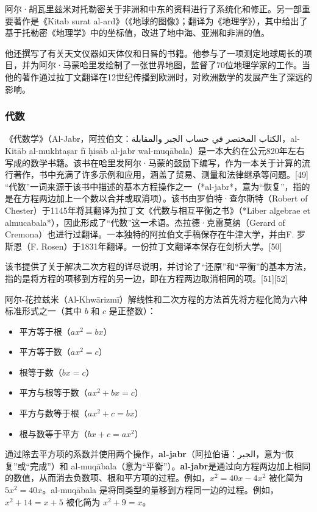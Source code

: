 阿尔·胡瓦里兹米对托勒密关于非洲和中东的资料进行了系统化和修正。另一部重要著作是《Kitab surat al-ard》（《地球的图像》；翻译为《地理学》），其中给出了基于托勒密《地理学》中的坐标值，改进了地中海、亚洲和非洲的值。

他还撰写了有关天文仪器如天体仪和日晷的书籍。他参与了一项测定地球周长的项目，并为阿尔·马蒙哈里发绘制了一张世界地图，监督了70位地理学家的工作。当他的著作通过拉丁文翻译在12世纪传播到欧洲时，对欧洲数学的发展产生了深远的影响。
\subsubsection{代数}
《代数学》（Al-Jabr，阿拉伯文：الكتاب المختصر في حساب الجبر والمقابلة，al-Kitāb al-mukhtaṣar fī ḥisāb al-jabr wal-muqābala）是一本大约在公元820年左右写成的数学书籍。该书在哈里发阿尔·马蒙的鼓励下编写，作为一本关于计算的流行著作，书中充满了许多示例和应用，涵盖了贸易、测量和法律继承等问题。[49] “代数”一词来源于该书中描述的基本方程操作之一（*al-jabr*，意为“恢复”，指的是在方程两边加上一个数以合并或取消项）。该书由罗伯特·查尔斯特（Robert of Chester）于1145年将其翻译为拉丁文《代数与相互平衡之书》（*Liber algebrae et almucabala*），因此形成了“代数”这一术语。杰拉德·克雷莫纳（Gerard of Cremona）也进行过翻译。一本独特的阿拉伯文手稿保存在牛津大学，并由F. 罗斯恩（F. Rosen）于1831年翻译。一份拉丁文翻译本保存在剑桥大学。[50]

该书提供了关于解决二次方程的详尽说明，并讨论了“还原”和“平衡”的基本方法，指的是将方程的项移到方程的另一边，即在方程两边取消相同的项。[51][52]

阿尔-花拉兹米（Al-Khwārizmī）解线性和二次方程的方法首先将方程化简为六种标准形式之一（其中 \(b\) 和 \(c\) 是正整数）：
\begin{itemize}
\item 平方等于根（\(ax^2 = bx\)）
\item 平方等于数（\(ax^2 = c\)）
\item 根等于数（\(bx = c\)）
\item 平方与根等于数（\(ax^2 + bx = c\)）
\item 平方与数等于根（\(ax^2 + c = bx\)）
\item 根与数等于平方（\(bx + c = ax^2\)）
\end{itemize}
通过除去平方项的系数并使用两个操作，\textbf{al-jabr}（阿拉伯语：الجبر，意为“恢复”或“完成”）和 al-muqābala（意为“平衡”）。\textbf{al-jabr}是通过向方程两边加上相同的数值，从而消去负数项、根和平方项的过程。例如，\(x^2 = 40x - 4x^2\) 被化简为 \(5x^2 = 40x\)。al-muqābala 是将同类型的量移到方程同一边的过程。例如，\(x^2 + 14 = x + 5\) 被化简为 \(x^2 + 9 = x\)。

